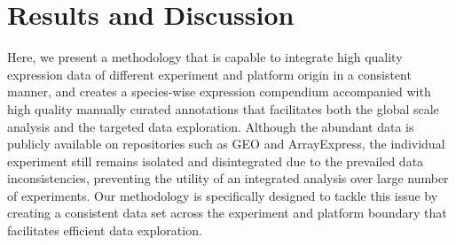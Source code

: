 








\section{Results and Discussion}


Here, we present a methodology that is capable to integrate high quality
expression data of different experiment and platform origin in a consistent
manner, and creates a species-wise expression compendium accompanied with
high quality manually curated annotations that facilitates both the global
scale analysis and the targeted data exploration.
%
Although the abundant data is publicly available on repositories such as
GEO and ArrayExpress, the individual experiment still remains isolated and
disintegrated due to the prevailed data inconsistencies, preventing the
utility of an integrated analysis over large number of experiments.
%
Our methodology is specifically designed to tackle this issue by creating a
consistent data set across the experiment and platform boundary that
facilitates efficient data exploration.


